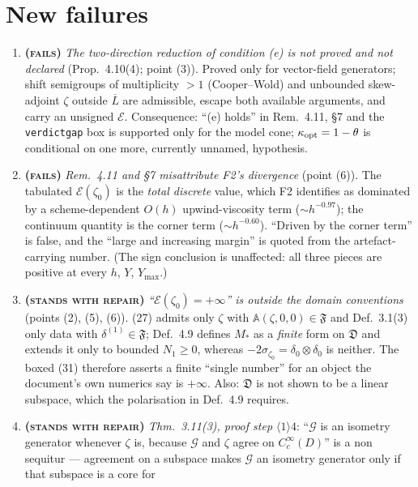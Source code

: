\documentclass[11pt]{article}
\newcommand{\Aop}{\mathbb A}
\begin{document}
\section{New failures}\label{sec:new}
\begin{enumerate}[leftmargin=2.4em,itemsep=1pt,label=\textbf{N\arabic*.}]
\item \textbf{(\textsc{fails})} \emph{The two-direction reduction of condition (e) is not
 proved and not declared} (Prop.~4.10(4); point (3)).  Proved only for vector-field
 generators; shift semigroups of multiplicity $>1$ (Cooper--Wold) and unbounded skew-adjoint
 $\zeta$ outside $\overline L$ are admissible, escape both available arguments, and carry
 an unsigned $\mathcal E$.  Consequence: ``(e) holds'' in Rem.~4.11, \S7 and the
 \texttt{verdictgap} box is supported only for the model cone; $\kappa_{\rm opt}=1-\theta$
 is conditional on one more, currently unnamed, hypothesis.
\item \textbf{(\textsc{fails})} \emph{Rem.~4.11 and \S7 misattribute F2's divergence}
 (point (6)).  The tabulated $\mathcal E(\zeta_0)$ is the \emph{total discrete} value, which
 F2 identifies as dominated by a scheme-dependent $O(h)$ upwind-viscosity term
 ($\sim h^{-0.97}$); the continuum quantity is the corner term ($\sim h^{-0.60}$).
 ``Driven by the corner term'' is false, and the ``large and increasing margin'' is quoted
 from the artefact-carrying number.  (The sign conclusion is unaffected: all three pieces
 are positive at every $h$, $Y$, $Y_{\max}$.)
\item \textbf{(\textsc{stands with repair})} \emph{``$\mathcal E(\zeta_0)=+\infty$'' is
 outside the domain conventions} (points (2), (5), (6)).  (27) admits only $\zeta$ with
 $\Aop(\zeta,0,0)\in\mathfrak F$ and Def.~3.1(3) only data with $\delta^{(1)}\in\mathfrak F$;
 Def.~4.9 defines $M_*$ as a \emph{finite} form on $\mathfrak D$ and extends it only to
 bounded $N_1\ge0$, whereas $-2\sigma_{\zeta_0}=\delta_0\otimes\delta_0$ is neither.  The
 boxed (31) therefore asserts a finite ``single number'' for an object the document's own
 numerics say is $+\infty$.  Also: $\mathfrak D$ is not shown to be a linear subspace,
 which the polarisation in Def.~4.9 requires.
\item \textbf{(\textsc{stands with repair})} \emph{Thm.~3.11(3), proof step
 $\langle1\rangle4$}: ``$\mathcal G$ is an isometry generator whenever $\zeta$ is, because
 $\mathcal G$ and $\zeta$ agree on $C_c^\infty(D)$'' is a non sequitur --- agreement on a
 subspace makes $\mathcal G$ an isometry generator only if that subspace is a core for

\end{enumerate}
\end{document}
